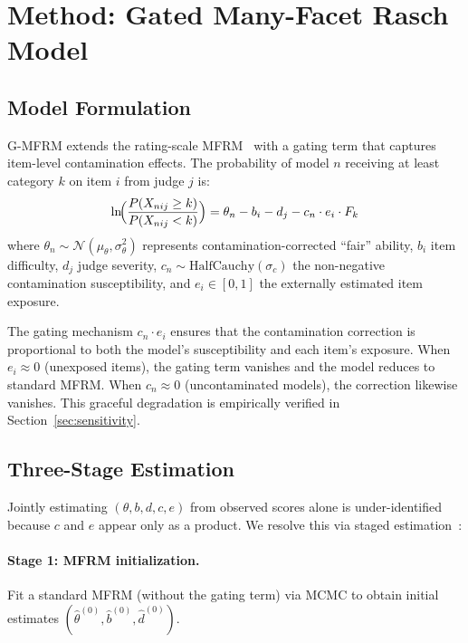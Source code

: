 \documentclass[11pt]{article}
\newcommand{\gmfrm}{\textsc{G-MFRM}}
\newcommand{\ei}{e_i}
\newcommand{\cn}{c_n}
\newcommand{\djud}{d_j}
\newcommand{\bitem}{b_i}
\begin{document}
\section{Method: Gated Many-Facet Rasch Model}
\label{sec:method}

\subsection{Model Formulation}

\gmfrm{} extends the rating-scale MFRM~\citep{linacre1989mfrm} with a gating term that captures item-level contamination effects. The probability of model $n$ receiving at least category $k$ on item $i$ from judge $j$ is:
\begin{equation}
\label{eq:gmfrm}
\ln\!\Bigl(\frac{P(X_{nij} \ge k)}{P(X_{nij} < k)}\Bigr) = \theta_n - \bitem - \djud - \cn \cdot \ei \cdot F_k
\end{equation}
where $\theta_n \sim \mathcal{N}(\mu_\theta, \sigma_\theta^2)$ represents contamination-corrected ``fair'' ability, $\bitem$ item difficulty, $\djud$ judge severity, $\cn \sim \text{HalfCauchy}(\sigma_c)$ the non-negative contamination susceptibility, and $\ei \in [0, 1]$ the externally estimated item exposure.

The gating mechanism $\cn \cdot \ei$ ensures that the contamination correction is proportional to both the model's susceptibility and each item's exposure. When $\ei \approx 0$ (unexposed items), the gating term vanishes and the model reduces to standard MFRM. When $\cn \approx 0$ (uncontaminated models), the correction likewise vanishes. This graceful degradation is empirically verified in Section~\ref{sec:sensitivity}.

\subsection{Three-Stage Estimation}
\label{sec:stages}

Jointly estimating $(\theta, b, d, c, e)$ from observed scores alone is under-identified because $c$ and $e$ appear only as a product. We resolve this via staged estimation~\citep{heckman1979sample}:

\paragraph{Stage 1: MFRM initialization.} Fit a standard MFRM (without the gating term) via MCMC to obtain initial estimates $(\hat\theta^{(0)}, \hat{b}^{(0)}, \hat{d}^{(0)})$.
\end{document}
